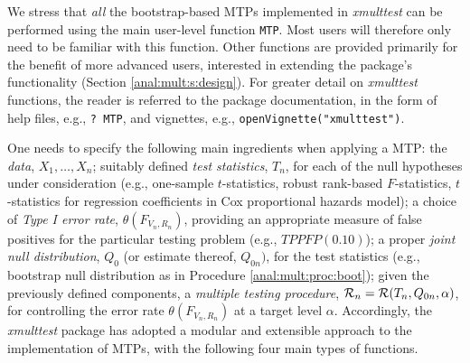 \documentclass[11pt]{article}
\newcommand{\Rpackage}[1]{\textit{#1}}
\newcommand{\Robject}[1]{\texttt{#1}}
\begin{document}
We stress that {\em all} the bootstrap-based MTPs implemented in \Rpackage{xmulttest} can be performed using the main user-level function \Robject{MTP}. 
Most users will therefore only need to be familiar with this function. 
Other functions are provided primarily for the benefit of more advanced users, interested in extending the package's functionality (Section \ref{anal:mult:s:design}).
For greater detail on \Rpackage{xmulttest} functions, the reader is referred to the package documentation, in the form of help files, e.g., \Robject{? MTP}, and vignettes, e.g., \Robject{openVignette("xmulttest")}. 

One needs to specify the following main ingredients when applying a MTP: 
the {\em data}, $X_1, \ldots, X_n$; 
suitably defined {\em test statistics}, $T_n$, for each of the null hypotheses under consideration (e.g., one-sample $t$-statistics, robust rank-based $F$-statistics, $t$-statistics for regression coefficients in Cox proportional hazards model); 
a choice of {\em Type I error rate}, $\theta(F_{V_n,R_n})$, providing an appropriate measure of false positives for the particular testing problem (e.g., $TPPFP(0.10)$);
a proper {\em joint null distribution}, $Q_0$ (or estimate thereof, $Q_{0n})$, for the test statistics (e.g., bootstrap null distribution as in Procedure \ref{anal:mult:proc:boot}); 
given the previously defined components, a {\em multiple testing procedure}, ${\cal R}_n={\cal R}(T_n, Q_{0n},\alpha)$, for controlling the error rate $\theta(F_{V_n,R_n})$ at a target level $\alpha$.
Accordingly, the \Rpackage{xmulttest} package has adopted a modular and extensible approach to the implementation of MTPs, with the following four main types of functions.
\end{document}
